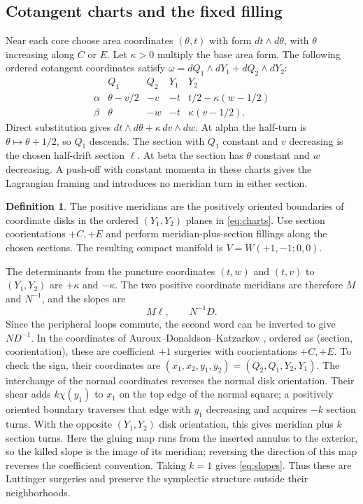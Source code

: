 \documentclass[11pt]{amsart}
\theoremstyle{definition}
\newtheorem{definition}[theorem]{Definition}
\theoremstyle{remark}
\begin{document}
\subsection{Cotangent charts and the fixed filling}
Near each core choose area coordinates $(\theta,t)$ with form
$dt\wedge d\theta$, with $\theta$ increasing along $C$ or $E$.
Let $\kappa>0$ multiply the base area form. The following ordered
cotangent coordinates satisfy
$\omega=dQ_1\wedge dY_1+dQ_2\wedge dY_2$:
\begin{equation}\label{eq:charts}
\begin{array}{c|cc|cc}
 &Q_1&Q_2&Y_1&Y_2\\ \hline
 \alpha&\theta-v/2&-v&-t&t/2-\kappa(w-1/2)\\
 \beta&\theta&-w&-t&\kappa(v-1/2).
\end{array}
\end{equation}
Direct substitution gives $dt\wedge d\theta+\kappa\,dv\wedge dw$.
At alpha the half-turn is $\theta\mapsto\theta+1/2$, so $Q_1$
descends. The section with $Q_1$ constant and $v$ decreasing is the
chosen half-drift section $\ell$. At beta the section has $\theta$
constant and $w$ decreasing. A push-off with constant momenta in
these charts gives the Lagrangian framing and introduces no meridian
turn in either section.

\begin{definition}\label{def:V}
The positive meridians are the positively oriented boundaries of
coordinate disks in the ordered $(Y_1,Y_2)$ planes in
\eqref{eq:charts}. Use section coorientations $+C,+E$ and perform
meridian-plus-section fillings along the chosen sections. The resulting
compact manifold is $V=W(+1,-1;0,0)$.
\end{definition}

The determinants from the puncture coordinates $(t,w)$ and $(t,v)$
to $(Y_1,Y_2)$ are $+\kappa$ and $-\kappa$. The two positive
coordinate meridians are therefore $M$ and $N^{-1}$, and the slopes are
\begin{equation}\label{eq:slopes}
                         M\ell,\qquad N^{-1}D.
\end{equation}
Since the peripheral loops commute, the second word can be inverted
to give $ND^{-1}$. In the coordinates of
Auroux--Donaldson--Katzarkov \cite[Section 2.1]{ADK03}, ordered as
(section, coorientation), these are coefficient $+1$ surgeries with
coorientations $+C,+E$. To check the sign, their coordinates are
$(x_1,x_2,y_1,y_2)=(Q_2,Q_1,Y_2,Y_1)$. The interchange of the
normal coordinates reverses the normal disk orientation. Their shear
adds $k\chi(y_1)$ to $x_1$ on the top edge of the normal square;
a positively oriented boundary traverses that edge with $y_1$
decreasing and acquires $-k$ section turns. With the opposite
$(Y_1,Y_2)$ disk orientation, this gives meridian plus $k$ section
turns. Here the gluing map runs from the inserted annulus to the
exterior, so the killed slope is the image of its meridian; reversing
the direction of this map reverses the coefficient convention.
Taking $k=1$ gives \eqref{eq:slopes}. Thus these are
Luttinger surgeries and preserve the symplectic structure outside
their neighborhoods.
\end{document}
